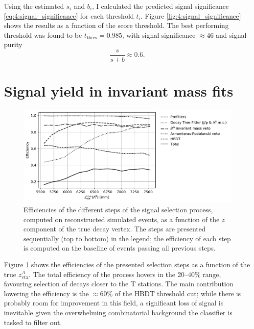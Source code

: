 Using the estimated $s_i$ and $b_i$, I calculated the predicted signal significance \eqref{eq:4:signal_significance} for each threshold $t_i$.
Figure \ref{fig:4:signal_significance} shows the results as a function of the score threshold.
The best performing threshold was found to be $t_\text{thres} = 0.985$, with signal significance $\approx 46$ and signal purity
\begin{equation}
	\frac{s}{s+b} \approx 0.6.
\end{equation}

\section{Signal yield in invariant mass fits}
\label{sec:4:performance_data}

\begin{figure}[t]
	\centering
	\includegraphics[width=\textwidth]{graphics/04-event_selection/selection_efficiencies.pdf}
	\caption{Efficiencies of the different steps of the \demonstratorshort signal selection process, computed on reconstructed simulated events, as a function of the $z$ component of the true \lambdadecay decay vertex. The steps are presented sequentially (top to bottom) in the legend; the efficiency of each step is computed on the baseline of events passing all previous steps.}
	\label{fig:4:selection_efficiencies}
\end{figure}

Figure \ref{fig:4:selection_efficiencies} shows the efficiencies of the presented selection steps as a function of the true $z_\mathrm{vtx}^\Lambda$.
The total efficiency of the process hovers in the 20--40\% range, favouring selection of decays closer to the T stations.
The main contribution lowering the efficiency is the $\approx 60\%$ of the HBDT threshold cut;
while there is probably room for improvement in this field, a significant loss of signal is inevitable given the overwhelming combinatorial background the classifier is tasked to filter out.

